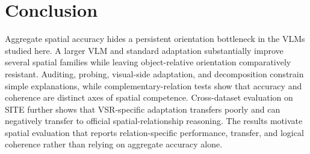 \section{Conclusion}
Aggregate spatial accuracy hides a persistent orientation bottleneck in the VLMs studied here. A larger VLM and standard adaptation substantially improve several spatial families while leaving object-relative orientation comparatively resistant. Auditing, probing, visual-side adaptation, and decomposition constrain simple explanations, while complementary-relation tests show that accuracy and coherence are distinct axes of spatial competence. Cross-dataset evaluation on SITE further shows that VSR-specific adaptation transfers poorly and can negatively transfer to official spatial-relationship reasoning. The results motivate spatial evaluation that reports relation-specific performance, transfer, and logical coherence rather than relying on aggregate accuracy alone.

